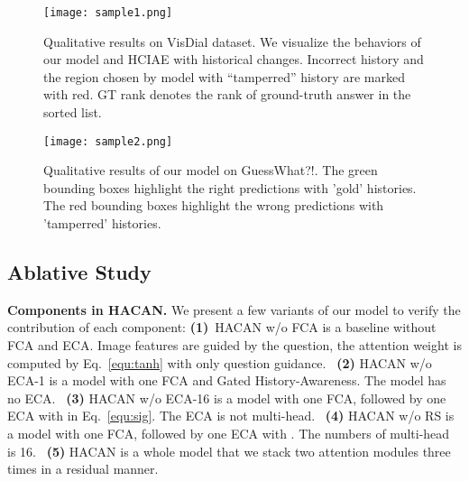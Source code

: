\documentclass[10pt,twocolumn,letterpaper]{article}
\begin{document}
\begin{figure}[t]
\begin{center}
\texttt{[image: sample1.png]}
\end{center}
   \caption{Qualitative results on VisDial dataset. We visualize the behaviors of our model and HCIAE with historical changes. Incorrect history and the region chosen by model with “tamperred” history are marked with red. GT rank denotes the rank of ground-truth answer in the sorted list.}
\label{fig:sample1}
\end{figure}
\begin{figure}[t]
\begin{center}
\texttt{[image: sample2.png]}
\end{center}
   \caption{Qualitative results of our model on GuessWhat?!. The green bounding boxes highlight the right predictions with ’gold’ histories. The red bounding boxes highlight the wrong predictions with ’tamperred’ histories. }
\label{fig:sample2}
\end{figure}

\subsection{Ablative Study}
\noindent \textbf{Components in HACAN.} We present a few variants of our model to verify the contribution of each component:
\textbf{(1)}~HACAN w/o FCA is a baseline without FCA and ECA. Image features are guided by the question, the attention weight is computed by Eq.~\eqref{equ:tanh} with only question guidance.
~\textbf{(2)} HACAN w/o ECA-1 is a model with one FCA and Gated History-Awareness. The model has no ECA.
~\textbf{(3)} HACAN w/o ECA-16 is a model with one FCA, followed by one ECA with  in Eq.~\eqref{equ:sig}. The ECA is not multi-head.
~\textbf{(4)} HACAN w/o RS is a model with one FCA, followed by one ECA with . The numbers of multi-head is 16.
~\textbf{(5)} HACAN is a whole model that we stack two attention modules three times in a residual manner.
\end{document}
